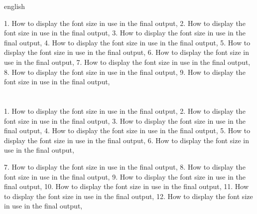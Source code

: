\begin{otherlanguage*}{english}

\englishword{\showfont}

1. How to display the font size in use in the final output,
2. How to display the font size in use in the final output,
3. How to display the font size in use in the final output,
4. How to display the font size in use in the final output,
5. How to display the font size in use in the final output,
6. How to display the font size in use in the final output,
7. How to display the font size in use in the final output,
8. How to display the font size in use in the final output,
9. How to display the font size in use in the final output,


%
\newpage



\section[Some encoding tests]{\englishword{\showfont}}

1. How to display the font size in use in the final output,
2. How to display the font size in use in the final output,
3. How to display the font size in use in the final output,
4. How to display the font size in use in the final output,
5. How to display the font size in use in the final output,
6. How to display the font size in use in the final output,

7. How to display the font size in use in the final output,
8. How to display the font size in use in the final output,
9. How to display the font size in use in the final output,
10. How to display the font size in use in the final output,
11. How to display the font size in use in the final output,
12. How to display the font size in use in the final output,

\subsection{\englishword{\showfont}}


\end{otherlanguage*}
